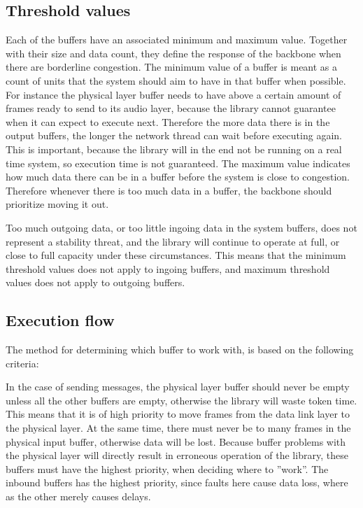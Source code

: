 \subsection{Threshold values}
Each of the buffers have an associated minimum and maximum value. Together with their size and data count, they define the response of the backbone when there are borderline congestion.
The minimum value of a buffer is meant as a count of units that the system should aim to have in that buffer when possible. For instance the physical layer buffer needs to have above a certain amount of frames ready to send to its audio layer, because the library cannot guarantee when it can expect to execute next. Therefore the more data there is in the output buffers, the longer the network thread can wait before executing again. This is important, because the library will in the end not be running on a real time system, so execution time is not guaranteed.
The maximum value indicates how much data there can be in a buffer before the system is close to congestion. Therefore whenever there is too much data in a buffer, the backbone should prioritize moving it out.


Too much outgoing data, or too little ingoing data in the system buffers, does not represent a stability threat, and the library will continue to operate at full, or close to full capacity under these circumstances. This means that the minimum threshold values does not apply to ingoing buffers, and maximum threshold values does not apply to outgoing buffers.


\subsection{Execution flow}
The method for determining which buffer to work with, is based on the following criteria:

In the case of sending messages, the physical layer buffer should never be empty unless all the other buffers are empty, otherwise the library will waste token time. This means that it is of high priority to move frames from the data link layer to the physical layer.
At the same time, there must never be to many frames in the physical input buffer, otherwise data will be lost. Because buffer problems with the physical layer will directly result in erroneous operation of the library, these buffers must have the highest priority, when deciding where to ''work''. The inbound buffers has the highest priority, since faults here cause data loss, where as the other merely causes delays.

